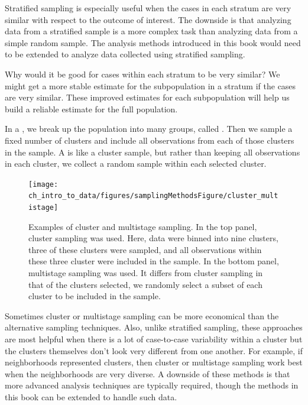 Stratified sampling is especially useful when the cases in each stratum are very similar with respect to the outcome of interest. The downside is that analyzing data from a stratified sample is a more complex task than analyzing data from a simple random sample. The analysis methods introduced in this book would need to be extended to analyze data collected using stratified sampling.

\begin{examplewrap}
\begin{nexample}{Why would it be good for cases within
    each stratum to be very similar?}
  We might get a more stable estimate for the subpopulation
  in a stratum if the cases are very similar.
  These improved estimates for each subpopulation will help
  us build a reliable estimate for the full population.
\end{nexample}
\end{examplewrap}

In a , we break up the population into many groups, called . Then we sample a fixed number of clusters and include all observations from each of those clusters in the sample. A  is like a cluster sample, but rather than keeping all observations in each cluster, we collect a random sample within each selected cluster. %

\begin{figure}
\centering
\texttt{[image: ch\_intro\_to\_data/figures/samplingMethodsFigure/cluster\_multistage]}
\caption{Examples of cluster and multistage sampling. In the top panel, cluster sampling was used. Here, data were binned into nine clusters, three of these clusters were sampled, and all observations within these three cluster were included in the sample. In the bottom panel, multistage sampling was used.
It differs from cluster sampling in that of the clusters selected, we randomly select a subset of each cluster to be included in the sample.}
\label{cluster_multistage}
\end{figure}

Sometimes cluster or multistage sampling can be more economical than the alternative sampling techniques. Also, unlike stratified sampling, these approaches are most helpful when there is a lot of case-to-case variability within a cluster but the clusters themselves don't look very different from one another. For example, if neighborhoods represented clusters, then cluster or multistage sampling work best when the neighborhoods are very diverse. A downside of these methods is that more advanced analysis techniques are typically required, though the methods in this book can be extended to handle such data.

